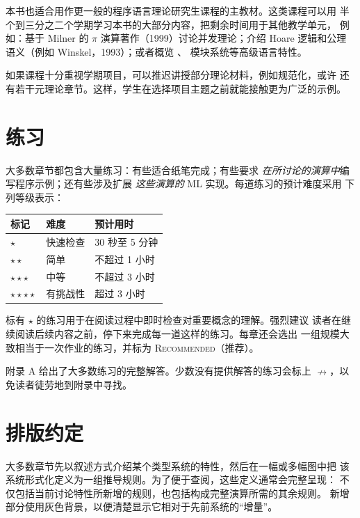 本书也适合用作更一般的程序语言理论研究生课程的主教材。这类课程可以用
半个到三分之二个学期学习本书的大部分内容，把剩余时间用于其他教学单元，
例如：基于 Milner 的 $\pi$ 演算著作（1999）讨论并发理论；介绍 Hoare
逻辑和公理语义（例如 Winskel，1993）；或者概览
、
模块系统等高级语言特性。

如果课程十分重视学期项目，可以推迟讲授部分理论材料，例如规范化，或许
还有若干元理论章节。这样，学生在选择项目主题之前就能接触更为广泛的示例。

\section*{练习}

大多数章节都包含大量练习：有些适合纸笔完成；有些要求
\emph{在所讨论的演算中}编写程序示例；还有些涉及扩展
\emph{这些演算的} ML 实现。每道练习的预计难度采用
下列等级表示：

\begin{center}
  \begin{tabular}{@{}lll@{}}
    \toprule
    标记 & 难度 & 预计用时 \\
    \midrule
    $\star$ & 快速检查 & 30 秒至 5 分钟 \\
    $\star\star$ & 简单 & 不超过 1 小时 \\
    $\star\star\star$ & 中等 & 不超过 3 小时 \\
    $\star\star\star\star$ & 有挑战性 & 超过 3 小时 \\
    \bottomrule
  \end{tabular}
\end{center}

标有 $\star$ 的练习用于在阅读过程中即时检查对重要概念的理解。强烈建议
读者在继续阅读后续内容之前，停下来完成每一道这样的练习。每章还会选出
一组规模大致相当于一次作业的练习，并标为 \textsc{Recommended}（推荐）。

附录 A 给出了大多数练习的完整解答。少数没有提供解答的练习会标上
$\nrightarrow$，以免读者徒劳地到附录中寻找。

\section*{排版约定}

大多数章节先以叙述方式介绍某个类型系统的特性，然后在一幅或多幅图中把
该系统形式化定义为一组推导规则。为了便于查阅，这些定义通常会完整呈现：
不仅包括当前讨论特性所新增的规则，也包括构成完整演算所需的其余规则。
新增部分使用灰色背景，以便清楚显示它相对于先前系统的“增量”。

